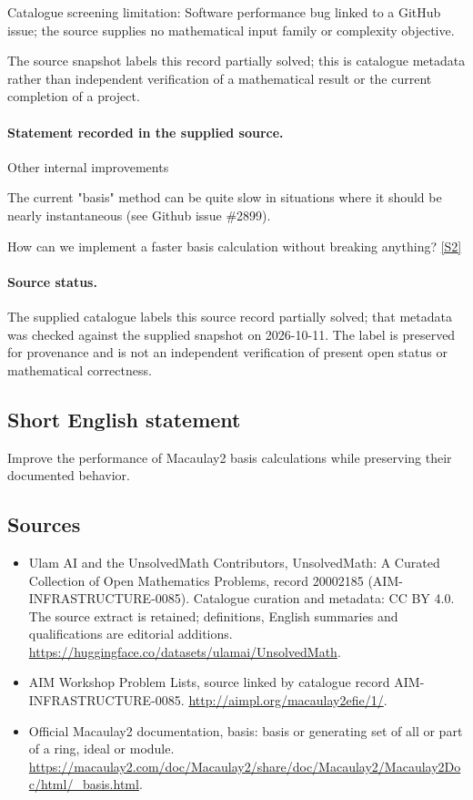 \documentclass[11pt]{article}
\begin{document}
Catalogue screening limitation: Software performance bug linked to a GitHub issue; the source supplies no mathematical input family or complexity objective.

The source snapshot labels this record partially solved; this is catalogue metadata rather than independent verification of a mathematical result or the current completion of a project.
\paragraph{Statement recorded in the supplied source.}
Other internal improvements

The current "basis" method can be quite slow in situations where it should be nearly instantaneous (see Github issue \#2899).

How can we implement a faster basis calculation without breaking anything? \href{http://aimpl.org/macaulay2efie/1/}{[S2]}
\paragraph{Source status.}
The supplied catalogue labels this source record partially solved; that metadata was checked against the supplied snapshot on 2026-10-11. The label is preserved for provenance and is not an independent verification of present open status or mathematical correctness.
\subsection{Short English statement}
Improve the performance of Macaulay2 basis calculations while preserving their documented behavior.
\subsection{Sources}
\begin{itemize}
\item[S1] Ulam AI and the UnsolvedMath Contributors, UnsolvedMath: A Curated Collection of Open Mathematics Problems, record 20002185 (AIM-INFRASTRUCTURE-0085). Catalogue curation and metadata: CC BY 4.0. The source extract is retained; definitions, English summaries and qualifications are editorial additions.
\url{https://huggingface.co/datasets/ulamai/UnsolvedMath}.
\item[S2] AIM Workshop Problem Lists, source linked by catalogue record AIM-INFRASTRUCTURE-0085.
\url{http://aimpl.org/macaulay2efie/1/}.
\item[S3] Official Macaulay2 documentation, basis: basis or generating set of all or part of a ring, ideal or module.
\url{https://macaulay2.com/doc/Macaulay2/share/doc/Macaulay2/Macaulay2Doc/html/_basis.html}.
\end{itemize}
\end{document}
